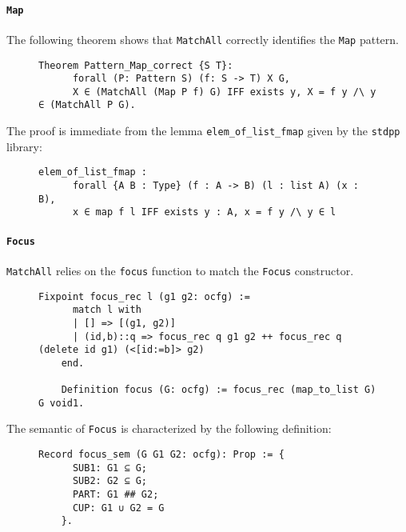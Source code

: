 \documentclass[11pt]{article}
\newcommand{\inlinecoq}[1]{\mbox{\lstinline[style=customcoq,columns=fixed,basewidth=.48em]{#1}}}
\newcommand{\ilc}[1]{\inlinecoq{#1}}
\begin{document}
\paragraph{\ilc{Map}}

The following theorem shows that \ilc{MatchAll} correctly identifies the \ilc{Map} pattern.

\begin{figure}[H]
  \label{fig:sem_when}
  \begin{lstlisting}[style=customcoq,basicstyle=\small\ttfamily]
    Theorem Pattern_Map_correct {S T}:
      forall (P: Pattern S) (f: S -> T) X G,
      X ∈ (MatchAll (Map P f) G) IFF exists y, X = f y /\ y ∈ (MatchAll P G).
  \end{lstlisting}
\end{figure}

The proof is immediate from the lemma \ilc{elem_of_list_fmap} given by the \ilc{stdpp} library:

\begin{figure}[H]
  \label{fig:list_fmap}
  \begin{lstlisting}[style=customcoq,basicstyle=\small\ttfamily]
    elem_of_list_fmap :
      forall {A B : Type} (f : A -> B) (l : list A) (x : B),
      x ∈ map f l IFF exists y : A, x = f y /\ y ∈ l
  \end{lstlisting}
\end{figure}

\paragraph{\ilc{Focus}}

\ilc{MatchAll} relies on the \ilc{focus} function to match the \ilc{Focus} constructor.

\begin{figure}[H]
  \label{fig:fun_focus}
  \begin{lstlisting}[style=customcoq,basicstyle=\small\ttfamily]
    Fixpoint focus_rec l (g1 g2: ocfg) :=
      match l with
      | [] => [(g1, g2)]
      | (id,b)::q => focus_rec q g1 g2 ++ focus_rec q (delete id g1) (<[id:=b]> g2)
    end.

    Definition focus (G: ocfg) := focus_rec (map_to_list G) G void1.
  \end{lstlisting}
\end{figure}

The semantic of \ilc{Focus} is characterized by the following definition:

\begin{figure}[H]
  \label{fig:sem_focus_def}
  \begin{lstlisting}[style=customcoq,basicstyle=\small\ttfamily]
    Record focus_sem (G G1 G2: ocfg): Prop := {
      SUB1: G1 ⊆ G;
      SUB2: G2 ⊆ G;
      PART: G1 ## G2;
      CUP: G1 ∪ G2 = G
    }.
  \end{lstlisting}
\end{figure}
\end{document}
